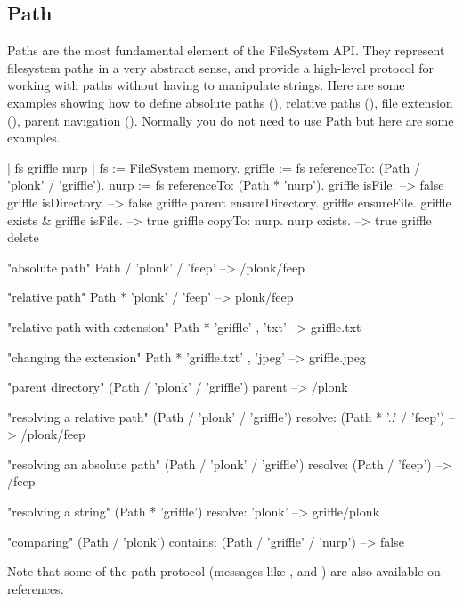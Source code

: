 \documentclass[a4paper,10pt,twoside]{book}
\begin{document}
\subsection{Path}
Paths are the most fundamental element of the FileSystem API. They represent filesystem paths in a very abstract sense, and provide a high-level protocol for working with paths without having to manipulate strings. Here are some examples showing how to 
define absolute paths (), relative paths (), file extension (), parent navigation ().
Normally you do not need to use Path but here are some examples.

\begin{code}{}
| fs griffle nurp | 
fs := FileSystem memory.
griffle := fs referenceTo: (Path / 'plonk' / 'griffle').
nurp := fs referenceTo: (Path * 'nurp').
griffle isFile.	
    --> false			
griffle isDirectory. 		
    --> false		
griffle parent ensureDirectory.
griffle ensureFile.
griffle exists & griffle isFile.		
    --> true
griffle copyTo: nurp.
nurp exists.			
    --> true	
griffle delete       
\end{code}    

\begin{code}{}
"absolute path"
Path / 'plonk' / 'feep'       --> /plonk/feep
    
"relative path"
Path * 'plonk' / 'feep'       --> plonk/feep

"relative path with extension"
Path * 'griffle' , 'txt'      --> griffle.txt
    
"changing the extension"
Path * 'griffle.txt' , 'jpeg'     --> griffle.jpeg
    
"parent directory"
(Path / 'plonk' / 'griffle') parent   --> /plonk
    
"resolving a relative path"
(Path / 'plonk' / 'griffle') resolve: (Path * '..' / 'feep')
                   --> /plonk/feep
    
"resolving an absolute path"
(Path / 'plonk' / 'griffle') resolve: (Path / 'feep')
                   --> /feep
                                           
"resolving a string"
(Path * 'griffle') resolve: 'plonk'   --> griffle/plonk
                        
"comparing"
(Path / 'plonk') contains: (Path / 'griffle' / 'nurp')
                     --> false
\end{code}

Note that some of the path protocol (messages like \ct{/},  and ) are also available on references.
\end{document}
